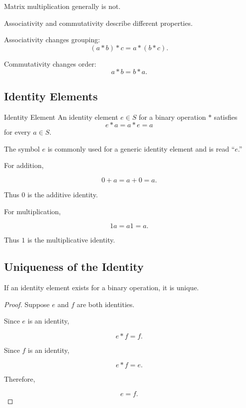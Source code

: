 Matrix multiplication generally is not.

\begin{warningbox}
Associativity and commutativity describe different properties.

Associativity changes grouping:
\[ (a*b)*c=a*(b*c). \]

Commutativity changes order:
\[ a*b=b*a. \]
\end{warningbox}

\subsection{Identity Elements}
\label{subsec:identity-elements}

\begin{definitionbox}{Identity Element}
An identity element \(e\in S\) for a binary operation \(*\) satisfies
\[ e*a=a*e=a \]
for every \(a\in S\).
\end{definitionbox}

The symbol \(e\) is commonly used for a generic identity element and is read
``\(e\).''

For addition,

\[ 0+a=a+0=a. \]

Thus \(0\) is the additive identity.

For multiplication,

\[ 1a=a1=a. \]

Thus \(1\) is the multiplicative identity.

\subsection{Uniqueness of the Identity}
\label{subsec:identity-unique}

\begin{theorem}
If an identity element exists for a binary operation, it is unique.
\end{theorem}

\begin{proof}
Suppose \(e\) and \(f\) are both identities.

Since \(e\) is an identity,

\[ e*f=f. \]

Since \(f\) is an identity,

\[ e*f=e. \]

Therefore,

\[ e=f. \]
\end{proof}

